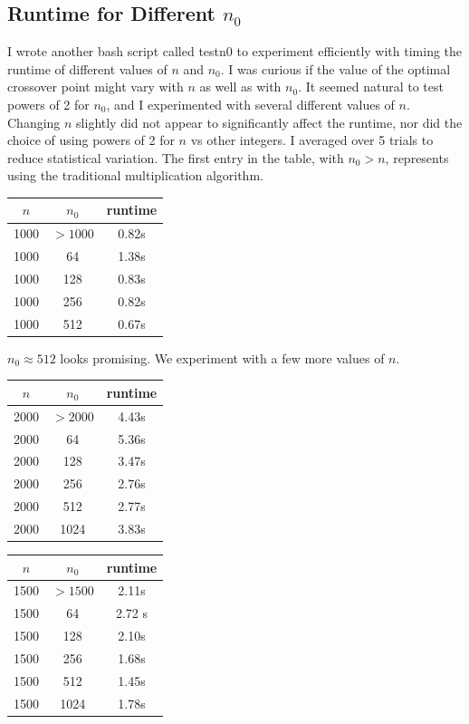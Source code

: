 \documentclass{article}
\begin{document}
\subsection*{Runtime for Different $n_0$}
I wrote another bash script called testn0 to experiment efficiently with timing the runtime of different values of $n$ and $n_0$. I was curious if the value of the optimal crossover point might vary with $n$ as well as with $n_0$. It seemed natural to test powers of 2 for $n_0$, and I experimented with several different values of $n$. Changing $n$ slightly did not appear to significantly affect the runtime, nor did the choice of using powers of 2 for $n$ vs other integers. I averaged over 5 trials to reduce statistical variation. The first entry in the table, with $n_0 > n$, represents using the traditional multiplication algorithm.
\begin{center}
\begin{tabular} { |c|c|c| }
\hline
$n$ & $n_0$ & runtime \\
\hline\hline
1000 & $>1000$ & 0.82s \\
\hline\hline
1000 & 64 & 1.38s \\
\hline
1000 & 128 & 0.83s \\
\hline
1000 & 256 & 0.82s \\
\hline
1000 & 512 & 0.67s \\ 
\hline
\end{tabular}
\end{center}
$ n_0 \approx 512$ looks promising. We experiment with a few more values of $n$. 
\begin{center}
\begin{tabular} { |c|c|c| }
\hline
$n$ & $n_0$ & runtime \\
\hline\hline
2000 & $>2000$ & 4.43s \\
\hline\hline
2000 & 64 & 5.36s \\
\hline
2000 & 128 & 3.47s \\
\hline
2000 & 256 & 2.76s\\
\hline
2000 & 512 & 2.77s \\ 
\hline
2000 & 1024 & 3.83s\\
\hline
\end{tabular}
\end{center}

\begin{center}
\begin{tabular} { |c|c|c| }
\hline
$n$ & $n_0$ & runtime \\
\hline\hline
1500 & $>1500$ & 2.11s \\
\hline\hline
1500 & 64 & 2.72 s \\
\hline
1500 & 128 & 2.10s \\
\hline
1500 & 256 & 1.68s\\
\hline
1500 & 512 & 1.45s \\ 
\hline
1500 & 1024 & 1.78s\\
\hline
\end{tabular}
\end{center}
\end{document}
